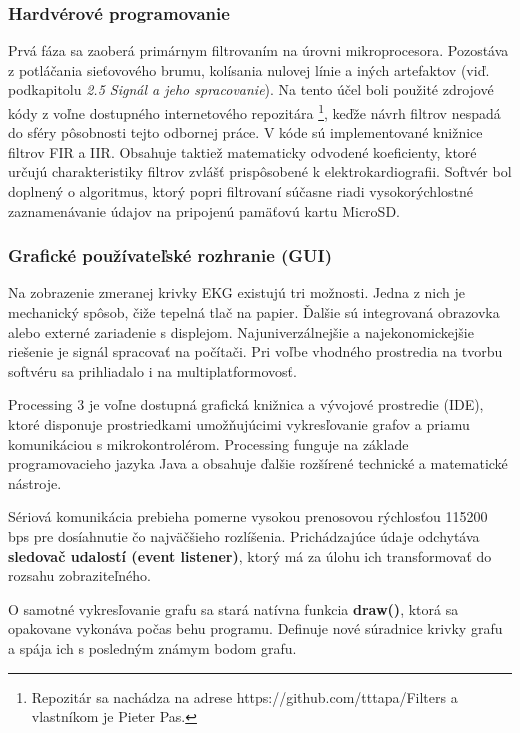 \documentclass[titlepage,12pt]{article}
\begin{document}
\subsubsection{Hardvérové programovanie}
Prvá fáza sa zaoberá primárnym filtrovaním na úrovni mikroprocesora. Pozostáva z potláčania sieťovového brumu, kolísania nulovej línie a iných artefaktov (viď. podkapitolu \textit{2.5 Signál \linebreak a jeho spracovanie}). Na tento účel boli použité zdrojové kódy z voľne dostupného internetového repozitára \footnote{Repozitár sa nachádza na adrese https://github.com/tttapa/Filters a vlastníkom je Pieter Pas.}, keďže návrh filtrov nespadá do sféry pôsobnosti tejto odbornej práce. V kóde sú implementované knižnice filtrov FIR a IIR. Obsahuje taktiež matematicky odvodené koeficienty, ktoré určujú charakteristiky filtrov zvlášť prispôsobené k elektrokardiografii. Softvér bol doplnený o algoritmus, ktorý popri filtrovaní súčasne riadi vysokorýchlostné zaznamenávanie údajov na pripojenú pamäťovú kartu MicroSD.

\subsubsection{Grafické používateľské rozhranie (GUI)}
Na zobrazenie zmeranej krivky EKG existujú tri možnosti. Jedna z nich je mechanický spôsob, čiže tepelná tlač na papier. Ďalšie sú integrovaná obrazovka alebo externé zariadenie s displejom. Najuniverzálnejšie a najekonomickejšie riešenie je signál spracovať na počítači. Pri voľbe vhodného prostredia na tvorbu softvéru sa prihliadalo i na multiplatformovosť.

Processing 3 je voľne dostupná grafická knižnica a vývojové prostredie (IDE), ktoré disponuje prostriedkami umožňujúcimi vykresľovanie grafov a priamu komunikáciou s mikrokontrolérom. Processing funguje na základe programovacieho jazyka Java a obsahuje ďalšie rozšírené technické a matematické nástroje. 

Sériová komunikácia prebieha pomerne vysokou prenosovou rýchlosťou 115200 bps pre dosíahnutie čo najväčšieho rozlíšenia. Prichádzajúce údaje odchytáva \textbf{sledovač udalostí (event listener)}, ktorý má za úlohu ich transformovať do rozsahu zobraziteľného.

O samotné vykresľovanie grafu sa stará natívna funkcia \textbf{draw()}, ktorá sa opakovane vykonáva počas behu programu. Definuje nové súradnice krivky grafu a spája ich s posledným známym bodom grafu.
\end{document}
